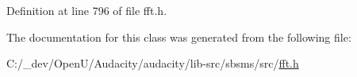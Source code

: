 Definition at line 796 of file fft.\+h.



The documentation for this class was generated from the following file\+:\begin{DoxyCompactItemize}
\item 
C\+:/\+\_\+dev/\+Open\+U/\+Audacity/audacity/lib-\/src/sbsms/src/\hyperlink{lib-src_2sbsms_2src_2fft_8h}{fft.\+h}\end{DoxyCompactItemize}
